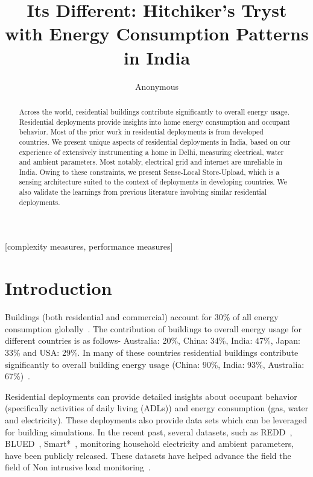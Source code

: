 \documentclass[10pt]{sensys-proc}
\author{
%
\alignauthor Anonymous \\
       \email{xyz@zyz.edu}
}
\title{Its Different: Hitchiker’s Tryst with Energy Consumption Patterns in India}
\newcommand{\paradigm}{Sense-Local Store-Upload}
\begin{document}
\maketitle

\begin{abstract}
Across the world, residential buildings contribute significantly to overall energy usage. Residential deployments provide insights into home energy consumption and occupant behavior. Most of the prior work in residential deployments is from developed countries. We present unique aspects of residential deployments in India, based on our experience of extensively instrumenting a home in Delhi, measuring electrical, water and ambient parameters. Most notably, electrical grid and internet are unreliable in India. Owing to these constraints, we present \paradigm, which is a sensing architecture suited to the context of deployments in developing countries. We also validate the learnings from previous literature involving similar residential deployments.
\end{abstract}

[complexity measures, performance measures]



\section{Introduction}
  \label{sec:intro}
Buildings (both residential and commercial) account for 30\% of all energy consumption globally~\cite{evans09india}. The contribution of buildings to overall energy usage for different countries is as follows- Australia: 20\%, China: 34\%, India: 47\%, Japan: 33\% and USA: 29\%. In many of these countries residential buildings contribute significantly to overall building energy usage (China: 90\%, India: 93\%, Australia: 67\%)~\cite{evans09aus,evans09us,evans09japan,evans09india,evans09china}.

Residential deployments can provide detailed insights about occupant behavior (specifically activities of daily living (ADLs)) and energy consumption (gas, water and electricity). These deployments also provide data sets which can be leveraged for building simulations. In the recent past, several datasets, such as REDD~\cite{redd}, BLUED~\cite{blued_cmu}, Smart*~\cite{smart}, monitoring household electricity and ambient parameters, have been publicly released. These datasets have helped advance the field the field of Non intrusive load monitoring~\cite{hart}.
\end{document}
